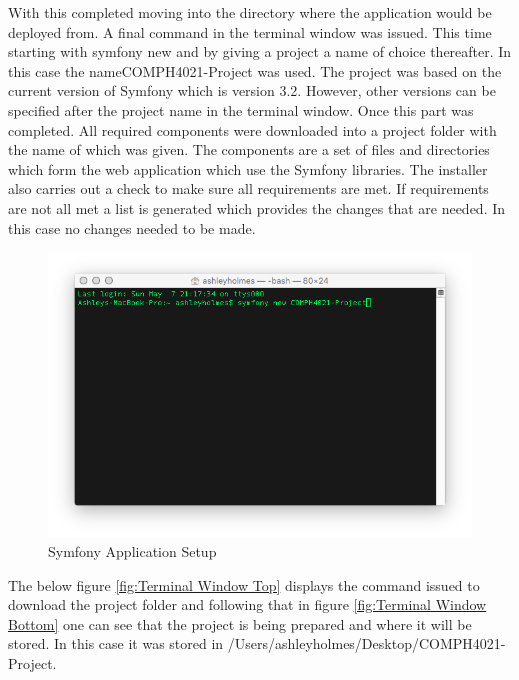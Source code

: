 With this completed moving into the directory where the application would be deployed from. A final command in the terminal window was issued. This time starting with symfony new and by giving a project a name of choice thereafter. In this case the name\newline COMPH4021-Project was used. The project was based on the current version of Symfony which is version 3.2. However, other versions can be specified after the project name in the terminal window. Once this part was completed. All required components were downloaded into a project folder with the name of which was given. The components are a set of files and directories which form the web application which use the Symfony libraries. The installer also carries out a check to make sure all requirements are met. If requirements are not all met a list is generated which provides the changes that are needed. In this case no changes needed to be made.

\begin{figure}[htbp]
   \centering
   \includegraphics[width=400pt]{figures/new_application.png} %
   \caption{Symfony Application Setup}
   \label{fig:Symfony Application Setup}
\end{figure}

The below figure \ref{fig:Terminal Window Top} displays the command issued to download the project folder and following that in figure \ref{fig:Terminal Window Bottom} one can see that the project is being prepared and where it will be stored. In this case it was stored in /Users/ashleyholmes/Desktop/COMPH4021-Project.

